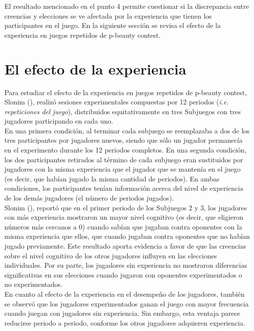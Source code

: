 El resultado mencionado en el punto 4 permite cuestionar si la discrepancia entre creencias y elecciones se ve afectada por la experiencia que tienen los participantes en el juego.  En la siguiente sección se revisa el efecto de la experiencia en juegos repetidos de p-beauty contest.

\section{El efecto de la experiencia}

Para estudiar el efecto de la experiencia en juegos repetidos de p-beauty contest, Slonim (\citeyear{Slonim}), realizó sesiones experimentales compuestas por 12 periodos (\textit{i.e. repeticiones del juego}), distribuidos equitativamente en tres Subjuegos con tres jugadores participando en cada uno.\\

En una primera condición, al terminar cada subjuego se reemplazaba a dos de los tres participantes por jugadores nuevos, siendo que sólo un jugador permanecía en el experimento durante los 12 periodos completos. En una segunda condición, los dos participantes retirados al término de cada subjuego eran sustituidos por jugadores con la misma experiencia que el jugador que se mantenía en el juego (es decir, que habían jugado la misma cantidad de periodos). En ambas condiciones, los participantes tenían información acerca del nivel de experiencia de los demás jugadores (el número de periodos jugados).\\

Slonim (\citeyear{Slonim}), reportó que en el primer periodo de los Subjuegos 2 y 3, los jugadores con más experiencia mostraron un mayor nivel cognitivo (es decir, que eligieron números más cercanos a 0) cuando sabían que jugaban contra oponentes con la misma experiencia que ellos, que cuando jugaban contra oponentes que no habían jugado previamente. Este resultado aporta evidencia a favor de que las creencias sobre el nivel cognitivo de los otros jugadores influyen en las elecciones individuales. Por su parte, los jugadores sin experiencia no mostraron diferencias signiﬁcativas en sus elecciones cuando jugaron con oponentes experimentados o no experimentados.\\

En cuanto al efecto de la experiencia en el desempeño de los jugadores, también se observó que los jugadores experimentados ganan el juego con mayor frecuencia cuando juegan con jugadores sin experiencia. Sin embargo, esta ventaja parece reducirse periodo a periodo, conforme los otros jugadores adquieren experiencia.\\

